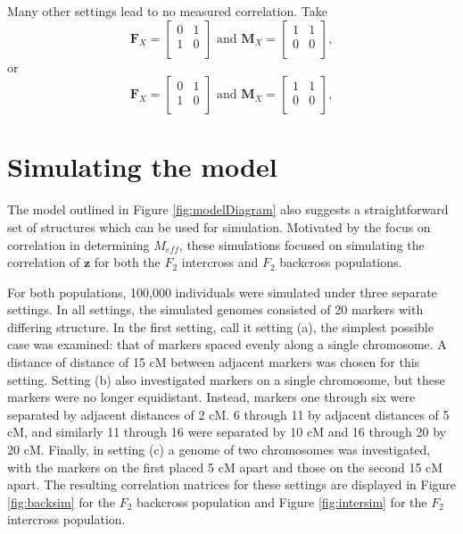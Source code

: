 \documentclass{article}
\newcommand{\ve}[1]{\mathbf{#1}}           %
\newcommand{\m}[1]{\mathbf{#1}}               %
\begin{document}
Many other settings lead to no measured correlation. Take
$$\m{F}_X = \begin{bmatrix}
  0 & 1 \\
  1 & 0 \\
\end{bmatrix} \text{ and } \m{M}_X = \begin{bmatrix}
  1 & 1 \\
  0 & 0 \\
\end{bmatrix},$$
or
$$\m{F}_X = \begin{bmatrix}
  0 & 1 \\
  1 & 0 \\
\end{bmatrix} \text{ and } \m{M}_X = \begin{bmatrix}
  1 & 1 \\
  0 & 0 \\
\end{bmatrix},$$

\section{Simulating the model} \label{subsec:sim}

The model outlined in Figure \ref{fig:modelDiagram} also suggests a straightforward set of structures which can be used for simulation. Motivated by the focus on correlation in determining $M_{eff}$, these simulations focused on simulating the correlation of $\ve{z}$ for both the $F_2$ intercross and $F_2$ backcross populations.

For both populations, 100,000 individuals were simulated under three separate settings. In all settings, the simulated genomes consisted of 20 markers with differing structure. In the first setting, call it setting (a), the simplest possible case was examined: that of markers spaced evenly along a single chromosome. A distance of distance of 15 cM between adjacent markers was chosen for this setting. Setting (b) also investigated markers on a single chromosome, but these markers were no longer equidistant. Instead, markers one through six were separated by adjacent distances of 2 cM. 6 through 11 by adjacent distances of 5 cM, and similarly 11 through 16 were separated by 10 cM and 16 through 20 by 20 cM. Finally, in setting (c) a genome of two chromosomes was investigated, with the markers on the first placed 5 cM apart and those on the second 15 cM apart. The resulting correlation matrices for these settings are displayed in Figure \ref{fig:backsim} for the $F_2$ backcross population and Figure \ref{fig:intersim} for the $F_2$ intercross population.
\end{document}
